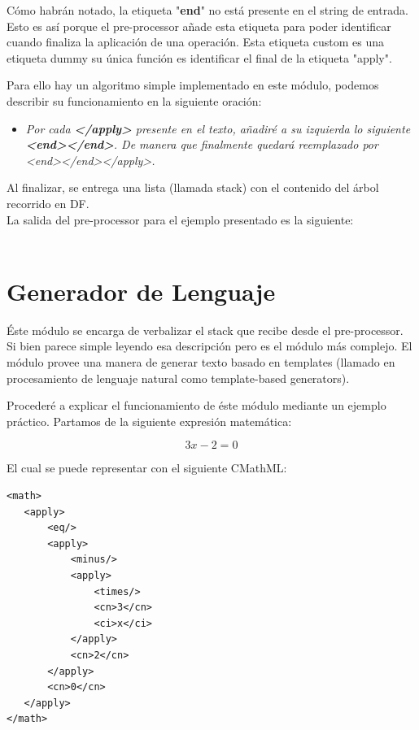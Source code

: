 Cómo habrán notado, la etiqueta "\textbf{end}" no está presente en el string de entrada. Esto es así porque el pre-processor añade esta etiqueta para poder identificar cuando finaliza la aplicación de una operación.
Esta etiqueta custom es una etiqueta dummy su única función es identificar el final de la etiqueta "apply".

Para ello hay un algoritmo simple implementado en este módulo, podemos describir su funcionamiento en la siguiente oración:

\begin{itemize}
\item \textit{Por cada \textbf{</apply>} presente en el texto, añadiré a su izquierda lo siguiente \textbf{<end></end>}. De manera que finalmente quedará reemplazado por <end></end></apply>.}
\end{itemize}

Al finalizar, se entrega una lista (llamada stack) con el contenido del árbol recorrido en DF.\\[0.01cm]

La salida del pre-processor para el ejemplo presentado es la siguiente:\\[0.01cm]

\\[0.01cm]


\section{Generador de Lenguaje}

Éste módulo se encarga de verbalizar el stack que recibe desde el pre-processor. Si bien parece simple leyendo esa descripción pero es el módulo más complejo. El módulo provee una manera de generar texto basado en templates (llamado en procesamiento de lenguaje natural como template-based generators\cite{7}).

Procederé a explicar el funcionamiento de éste módulo mediante un ejemplo práctico. Partamos de la siguiente expresión matemática:

$$3x - 2 = 0$$

El cual se puede representar con el siguiente CMathML:

\lstset{language=XML}
\begin{lstlisting}
<math>
   <apply>
       <eq/>
       <apply>
           <minus/>
           <apply>
               <times/>
               <cn>3</cn>
               <ci>x</ci>
           </apply>
           <cn>2</cn>
       </apply>
       <cn>0</cn>
   </apply>
</math>
\end{lstlisting}

